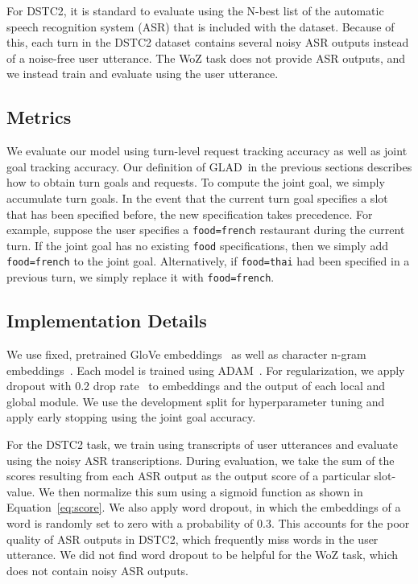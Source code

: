 \documentclass[11pt,a4paper]{article}
\newcommand{\modelnameshort}{GLAD}
\begin{document}
For DSTC2, it is standard to evaluate using the N-best list of the automatic speech recognition system (ASR) that is included with the dataset.
Because of this, each turn in the DSTC2 dataset contains several noisy ASR outputs instead of a noise-free user utterance.
The WoZ task does not provide ASR outputs, and we instead train and evaluate using the user utterance.




\subsection{Metrics}
We evaluate our model using turn-level request tracking accuracy as well as joint goal tracking accuracy.
Our definition of \modelnameshort~in the previous sections describes how to obtain turn goals and requests.
To compute the joint goal, we simply accumulate turn goals.
In the event that the current turn goal specifies a slot that has been specified before, the new specification takes precedence.
For example, suppose the user specifies a \texttt{food=french} restaurant during the current turn. 
If the joint goal has no existing \texttt{food} specifications, then we simply add \texttt{food=french} to the joint goal.
Alternatively, if \texttt{food=thai} had been specified in a previous turn, we simply replace it with \texttt{food=french}.





\subsection{Implementation Details}
We use fixed, pretrained GloVe embeddings~\cite{pennington2014glove} as well as character n-gram embeddings~\cite{Hashimoto2017joint}.
Each model is trained using ADAM~\cite{kingma2014adam}.
For regularization, we apply dropout with 0.2 drop rate~\cite{srivastava2014dropout} to embeddings and the output of each local and global module.
We use the development split for hyperparameter tuning and apply early stopping using the joint goal accuracy.



For the DSTC2 task, we train using transcripts of user utterances and evaluate using the noisy ASR transcriptions.
During evaluation, we take the sum of the scores resulting from each ASR output as the output score of a particular slot-value.
We then normalize this sum using a sigmoid function as shown in Equation~\eqref{eq:score}.
We also apply word dropout, in which the embeddings of a word is randomly set to zero with a probability of 0.3.
This accounts for the poor quality of ASR outputs in DSTC2, which frequently miss words in the user utterance.
We did not find word dropout to be helpful for the WoZ task, which does not contain noisy ASR outputs.
\end{document}
